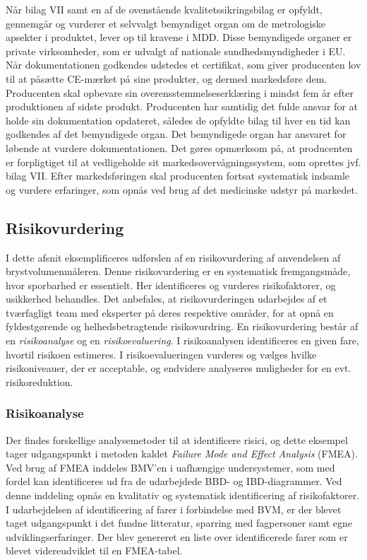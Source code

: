 Når bilag VII samt en af de ovenstående kvalitetssikringsbilag er opfyldt, gennemgår og vurderer et selvvalgt bemyndiget organ om de metrologiske apsekter i produktet, lever op til kravene i MDD. Disse bemyndigede organer er private virksomheder, som er udvalgt af nationale sundhedsmyndigheder i EU. Når dokumentationen godkendes udstedes et certifikat, som giver producenten lov til at påsætte CE-mærket på sine produkter, og dermed markedsføre dem.    
 Producenten skal opbevare sin overensstemmelseserklæring i mindst fem år efter produktionen af sidste produkt. Producenten har samtidig det fulde ansvar for at holde sin dokumentation opdateret, således de opfyldte bilag til hver en tid kan godkendes af det bemyndigede organ. Det bemyndigede organ har ansvaret for løbende at vurdere dokumentationen.
Det gøres opmærksom på, at producenten er forpligtiget til at vedligeholde sit markedsovervågningssystem, som oprettes jvf. bilag VII. Efter markedsføringen skal producenten fortsat systematisk indsamle og vurdere erfaringer, som opnås ved brug af det medicinske udstyr på markedet. 

\subsection{Risikovurdering}
I dette afsnit eksemplificeres udførslen af en risikovurdering af anvendelsen af brystvolumenmåleren. Denne risikovurdering er en systematisk fremgangsmåde, hvor sporbarhed er essentielt. Her identificeres og vurderes risikofaktorer, og usikkerhed behandles. 
Det anbefales, at risikovurderingen udarbejdes af et tværfagligt team med eksperter på deres respektive områder, for at opnå en fyldestgørende og helhedsbetragtende risikovurdring.   
En risikovurdering består af en \textit{risikoanalyse} og en \textit{risikoevaluering}. I risikoanalysen identificeres en given fare, hvortil risikoen estimeres. I risikoevalueringen vurderes og vælges hvilke risikoniveauer, der er acceptable, og endvidere analyseres muligheder for en evt. risikoreduktion.

	\subsubsection{Risikoanalyse}
	Der findes forskellige analysemetoder til at identificere risici, og dette eksempel tager udgangspunkt i metoden kaldet \textit{Failure Mode and Effect Analysis}{} (FMEA). Ved brug af FMEA inddeles BMV'en i uafhængige undersystemer, som med fordel kan identificeres ud fra de udarbejdede BBD- og IBD-diagrammer. Ved denne inddeling opnås en kvalitativ og systematisk identificering af risikofaktorer.
	I udarbejdelsen af identificering af farer i forbindelse med BVM, er der blevet taget udgangspunkt i det fundne litteratur, sparring med fagpersoner samt egne udviklingserfaringer. Der blev genereret en liste over identificerede farer som er blevet videreudviklet til en FMEA-tabel.  
	
